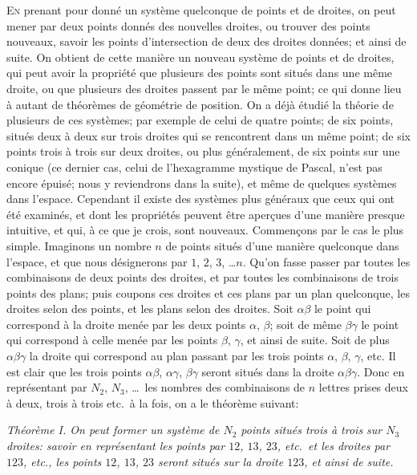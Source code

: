 \documentclass[11pt,a4paper]{book}
\begin{document}
\textsc{En} prenant pour donn\'e un syst\`eme quelconque de points et de droites, on peut mener par deux points donn\'es des nouvelles droites, ou trouver des points nouveaux, savoir les points d'intersection de deux des droites donn\'ees; et ainsi de suite. On obtient de cette mani\`ere un nouveau syst\`eme de points et de droites, qui peut avoir la propri\'et\'e que plusieurs des points sont situ\'es dans une m\^eme droite, ou que plusieurs des droites passent par le m\^eme point; ce qui donne lieu \`a autant de th\'eor\`emes de g\'eom\'etrie de position. On a d\'ej\`a \'etudi\'e la th\'eorie de plusieurs de ces syst\`emes; par exemple de celui de quatre points; de six points, situ\'es deux \`a deux sur trois droites qui se rencontrent dans un m\^eme point; de six points trois \`a trois sur deux droites, ou plus g\'en\'eralement, de six points sur une conique (ce dernier cas, celui de l'hexagramme mystique de Pascal, n'est pas encore \'epuis\'e; nous y reviendrons dans la suite), et m\^eme de quelques syst\`emes dans l'espace. Cependant il existe des syst\`emes plus g\'en\'eraux que ceux qui ont \'et\'e examin\'es, et dont les propri\'et\'es peuvent \^etre aper\c{c}ues d'une mani\`ere presque intuitive, et qui, \`a ce que je crois, sont nouveaux. Commen\c{c}ons par le cas le plus simple. Imaginons un nombre $n$ de points situ\'es d'une mani\`ere quelconque dans l'espace, et que nous d\'esignerons par $1$, $2$, $3$, \ldots $n$. Qu'on fasse passer par toutes les combinaisons de deux points des droites, et par toutes les combinaisons de trois points des plans; puis coupons ces droites et ces plans par un plan quelconque, les droites selon des points, et les plans selon des droites. Soit $\alpha\beta$ le point qui correspond \`a la droite men\'ee par les deux points $\alpha$, $\beta$; soit de m\^eme $\beta\gamma$ le point qui correspond \`a celle men\'ee par les points $\beta$, $\gamma$, et ainsi de suite. Soit de plus $\alpha\beta\gamma$ la droite qui correspond au plan passant par les trois points $\alpha$, $\beta$, $\gamma$, etc. Il est clair que les trois points $\alpha\beta$, $\alpha\gamma$, $\beta\gamma$ seront situ\'es dans la droite $\alpha\beta\gamma$. Donc en repr\'esentant par $N_2$, $N_3$, \ldots\ les nombres des combinaisons de $n$ lettres prises deux \`a deux, trois \`a trois etc.\ \`a la fois, on a le th\'eor\`eme suivant:

\smallskip
\textit{Th\'eor\`eme I. On peut former un syst\`eme de $N_2$ points situ\'es trois \`a trois sur $N_3$ droites: savoir en repr\'esentant les points par $12$, $13$, $23$, etc.\ et les droites par $123$, etc., les points $12$, $13$, $23$ seront situ\'es sur la droite $123$, et ainsi de suite.}
\smallskip
\end{document}
